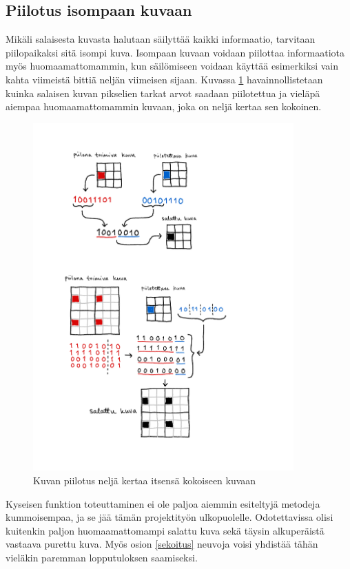 \documentclass[a4paper,11pt]{article}
\begin{document}
\subsection{Piilotus isompaan kuvaan}
\label{pieni-isoon}

Mikäli salaisesta kuvasta halutaan säilyttää kaikki informaatio, tarvitaan piilopaikaksi sitä isompi kuva. Isompaan kuvaan voidaan piilottaa informaatiota myös huomaamattomammin, kun säilömiseen voidaan käyttää esimerkiksi vain kahta viimeistä bittiä neljän viimeisen sijaan. Kuvassa \ref{metodi2} havainnollistetaan kuinka salaisen kuvan pikselien tarkat arvot saadaan piilotettua ja vieläpä aiempaa huomaamattomammin kuvaan, joka on neljä kertaa sen kokoinen.

\begin{figure}
    \centering
    \includegraphics[width= 100mm]{kuvat/steganografia-esim2.pdf}
    \caption{Kuvan piilotus neljä kertaa itsensä kokoiseen kuvaan}
    \label{metodi2}
\end{figure}

Kyseisen funktion toteuttaminen ei ole paljoa aiemmin esiteltyjä metodeja kummoisempaa, ja se jää tämän projektityön ulkopuolelle. Odotettavissa olisi kuitenkin paljon huomaamattomampi salattu kuva sekä täysin alkuperäistä vastaava purettu kuva. Myös osion \ref{sekoitus} neuvoja voisi yhdistää tähän vieläkin paremman lopputuloksen saamiseksi.
\end{document}
